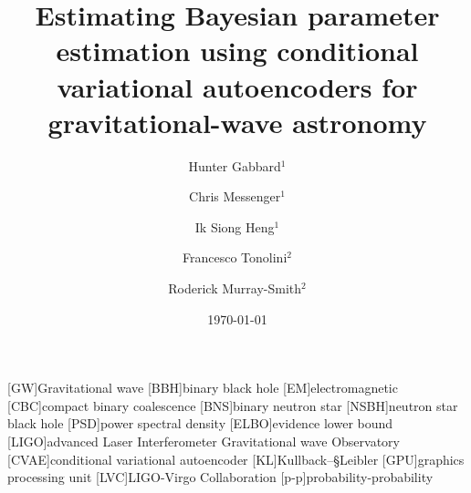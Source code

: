 \documentclass[%
showpacs,
 amsmath,amssymb,
 aps,
 twocolumn,
 prl,
 reprint,
floatfix,
]{revtex4-1}
\begin{document}

\title{Estimating Bayesian parameter estimation using conditional variational
autoencoders for gravitational-wave astronomy}

\author{Hunter Gabbard$^1$}
\author{Chris Messenger$^1$}
\author{Ik Siong Heng$^1$}
\author{Francesco Tonolini$^2$}
\author{Roderick Murray-Smith$^2$}


\date{\today}

\maketitle

%

[GW]{Gravitational wave}
[BBH]{binary black hole}
[EM]{electromagnetic}
[CBC]{compact binary coalescence}
[BNS]{binary neutron star}
[NSBH]{neutron star black hole}
[PSD]{power spectral density}
[ELBO]{evidence lower bound}
[LIGO]{advanced Laser Interferometer Gravitational wave Observatory}
[CVAE]{conditional variational autoencoder}
[KL]{Kullback--§Leibler}
[GPU]{graphics processing unit}
[LVC]{LIGO-Virgo Collaboration}
[p-p]{probability-probability}
\end{document}
